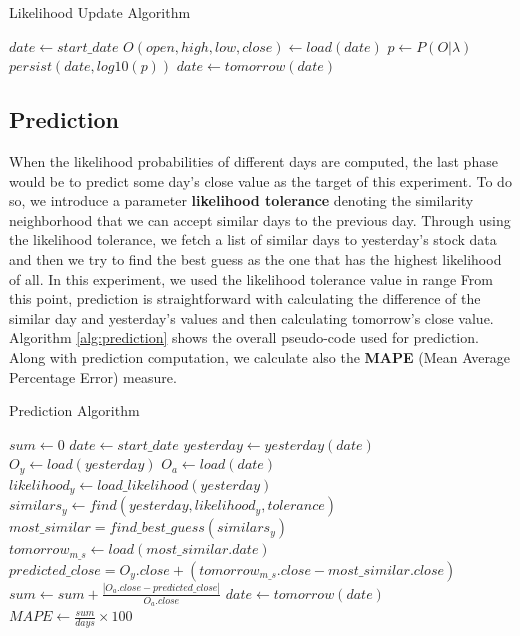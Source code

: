 \documentclass{acm_proc_article-sp}
\begin{document}
\begin{algorithm}[h] 
\caption{Likelihood Update Algorithm} \label{alg:likelihood}
\begin{algorithmic}[1]
\STATE $date \gets start\_date$
\STATE $ O(open, high, low, close) \gets load(date) $
\STATE $ p \gets P(O|\lambda) $ 
\STATE $ persist(date, log10(p)) $
\STATE $ date \gets tomorrow(date) $
\ENDFOR
\end{algorithmic}
\end{algorithm}

\subsection{Prediction} \label{sec:pred}
When the likelihood probabilities of different days are computed, the last phase would be to predict some day's close
value as the target of this experiment. To do so, we introduce a parameter \textbf{likelihood tolerance} denoting the
similarity neighborhood that we can accept similar days to the previous day. Through using the likelihood tolerance, we
fetch a list of similar days to yesterday's stock data and then we try to find the best guess as the one that has the
highest likelihood of all. In this experiment, we used the likelihood tolerance value in range \boldmath{[0.001, 0.01]}
From this point, prediction is straightforward with calculating the difference of the similar day and yesterday's
values and then calculating tomorrow's close value. Algorithm \ref{alg:prediction} shows the overall pseudo-code used
for prediction. Along with prediction computation, we calculate also the \textbf{MAPE} (Mean Average Percentage
Error) measure.

\begin{algorithm}[h]
\caption{Prediction Algorithm} \label{alg:prediction}
\begin{algorithmic}[1]
\STATE $ sum \gets 0 $
\STATE $ date \gets start\_date $
\STATE $ yesterday \gets yesterday(date) $
\STATE $ O_y \gets load(yesterday) $
\STATE $ O_a \gets load(date)$
\STATE $ likelihood_y \gets load\_likelihood(yesterday) $
\STATE $ similars_y \gets find(yesterday, likelihood_y, tolerance) $
\STATE $ most\_similar = find\_best\_guess(similars_y) $
\STATE $ tomorrow_{m\_s} \gets load(most\_similar.date) $
\STATE $ predicted\_close = O_y.close + (tomorrow_{m\_s}.close - most\_similar.close) $
\STATE $ sum \gets sum + \frac{|O_a.close - predicted\_close|}{O_a.close} $
\STATE $ date \gets tomorrow(date) $
\ENDFOR
\STATE $ MAPE \gets \frac{sum}{days} \times 100 $
\end{algorithmic}
\end{algorithm}
\end{document}
